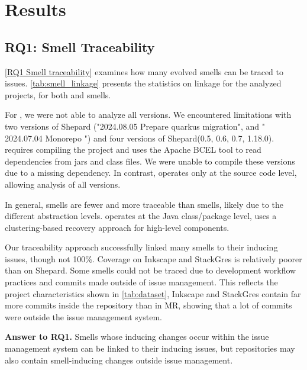 
\section{Results}
\subsection{RQ1: Smell Traceability}
\ref{RQ1 Smell traceability} examines how many evolved smells can be traced to issues.
\autoref{tab:smell_linkage} presents the statistics on linkage for the analyzed projects, for both \Arcan and \ARCADE smells.

For \Arcan, we were not able to analyze all versions.
We encountered limitations with two versions of Shepard ("2024.08.05 Prepare quarkus migration", and " 2024.07.04 Monorepo ") and four versions of Shepard(0.5, 0.6, 0.7, 1.18.0).
\Arcan requires compiling the project and uses the Apache BCEL tool to read dependencies from jars and class files.
We were unable to compile these versions due to a missing dependency.
In contrast, \ARCADE operates only at the source code level, allowing analysis of all versions.

In general, \ARCADE smells are fewer and more traceable than \Arcan smells, %
likely due to the different abstraction levels.
\Arcan operates at the Java class/package level, 
\ARCADE uses a clustering-based recovery approach for high-level components.

Our traceability approach successfully linked many smells to their inducing issues, though not 100\%.
Coverage on Inkscape and StackGres is relatively poorer than on Shepard.
Some smells could not be traced due to development workflow practices and commits made outside of issue management.
This reflects the project characteristics shown in \autoref{tab:dataset}, Inkscape and StackGres contain far more commits inside the repository than in MR, showing that a lot of commits were outside the issue management system.

\begin{rqanswer}
\textbf{Answer to RQ1.}
Smells whose inducing changes occur within the issue management system can be linked to their inducing issues, but repositories may also contain smell-inducing changes outside issue management.
\end{rqanswer}



